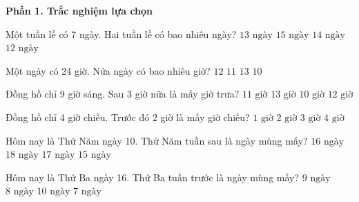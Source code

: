 \textbf{Phần 1. Trắc nghiệm lựa chọn}

\begin{ex} %
Một tuần lễ có 7 ngày. Hai tuần lễ có bao nhiêu ngày?
\choice
{$13\text{ ngày}$}
{$15\text{ ngày}$}
{\True $14\text{ ngày}$}
{$12\text{ ngày}$}
\end{ex}

\begin{ex} %
Một ngày có 24 giờ. Nửa ngày có bao nhiêu giờ?
\choice
{\True $12$}
{$11$}
{$13$}
{$10$}
\end{ex}

\begin{ex} %
Đồng hồ chỉ 9 giờ sáng. Sau 3 giờ nữa là mấy giờ trưa?
\choice
{$11\text{ giờ}$}
{$13\text{ giờ}$}
{$10\text{ giờ}$}
{\True $12\text{ giờ}$}
\end{ex}

\begin{ex} %
Đồng hồ chỉ 4 giờ chiều. Trước đó 2 giờ là mấy giờ chiều?
\choice
{$1\text{ giờ}$}
{\True $2\text{ giờ}$}
{$3\text{ giờ}$}
{$4\text{ giờ}$}
\end{ex}

\begin{ex} %
Hôm nay là Thứ Năm ngày 10. Thứ Năm tuần sau là ngày mùng mấy?
\choice
{$16\text{ ngày}$}
{$18\text{ ngày}$}
{\True $17\text{ ngày}$}
{$15\text{ ngày}$}
\end{ex}

\begin{ex} %
Hôm nay là Thứ Ba ngày 16. Thứ Ba tuần trước là ngày mùng mấy?
\choice
{\True $9\text{ ngày}$}
{$8\text{ ngày}$}
{$10\text{ ngày}$}
{$7\text{ ngày}$}
\end{ex}

